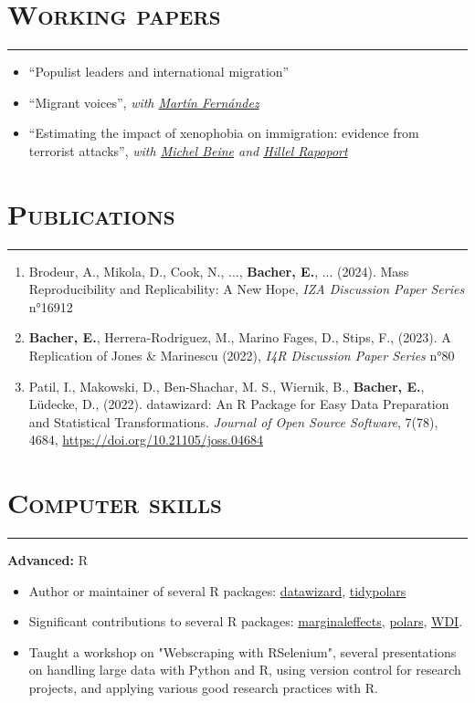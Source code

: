 \documentclass{article}
\newcommand{\sectionline}{%
  \vspace{-0.6cm}%
  \par\noindent\rule{\textwidth}{0.4pt}%
  \vspace{0.3cm}%
}
\let\xsection=\section
\renewcommand{\section}[1]{%
  \vspace{0.1cm}%
  \xsection*{\scshape{#1}}%
  \sectionline%
}
\def\tightlist{}
\begin{document}
\section{Working papers}

\begin{itemize}
\tightlist
\item
  ``Populist leaders and international migration''
\item
  ``Migrant voices'', \emph{with
  \href{https://sites.google.com/view/martinfernandezsanchez/}{Martín
  Fernández}}
\item
  ``Estimating the impact of xenophobia on immigration: evidence from terrorist attacks'', \emph{with
  \href{https://sites.google.com/site/michelbeineeconomics/home}{Michel
  Beine} and
  \href{https://www.parisschoolofeconomics.eu/en/rapoport-hillel/}{Hillel
  Rapoport}}
\end{itemize}

\section{Publications}

\begin{enumerate}
\def\labelenumi{\arabic{enumi}.}
\item
Brodeur, A., Mikola, D., Cook, N., ..., \textbf{Bacher, E.}, ... (2024). Mass Reproducibility and Replicability: A New Hope, \emph{IZA Discussion Paper Series} n°16912
\item
  \textbf{Bacher, E.}, Herrera-Rodriguez, M., Marino Fages, D., Stips,
  F., (2023). A Replication of Jones \& Marinescu (2022), \emph{I4R
  Discussion Paper Series} n°80
\item
  Patil, I., Makowski, D., Ben-Shachar, M. S., Wiernik, B.,
  \textbf{Bacher, E.}, Lüdecke, D., (2022). datawizard: An R Package for
  Easy Data Preparation and Statistical Transformations. \emph{Journal
  of Open Source Software}, 7(78), 4684,
  \url{https://doi.org/10.21105/joss.04684}
\end{enumerate}

\hypertarget{computer-skills}{%
\section{Computer skills}\label{computer-skills}}

\textbf{Advanced:} R

\begin{itemize}
\item
Author or maintainer of several R packages:
\href{https://easystats.github.io/datawizard/}{datawizard},
\href{https://tidypolars.etiennebacher.com/}{tidypolars}
\item
Significant contributions to several R packages:
\href{https://vincentarelbundock.github.io/marginaleffects/}{marginaleffects},
\href{https://rpolars.github.io/}{polars},
\href{https://vincentarelbundock.github.io/WDI/}{WDI}.
\item Taught a workshop on "Webscraping with RSelenium", several presentations on handling large data with Python and R, using version control for research projects, and applying various good research practices with R.
\end{itemize}
\end{document}
